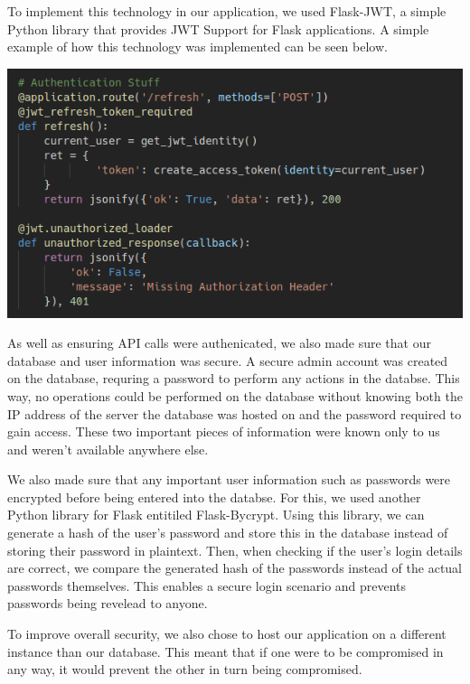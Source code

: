     To implement this technology in our application, we used Flask-JWT, a simple Python library that provides JWT Support for Flask applications.
    A simple example of how this technology was implemented can be seen below.

    \begin{center}    
      \includegraphics{img/JWTExample.png}
    \end{center}

    As well as ensuring API calls were authenicated, we also made sure that our database and user information was secure. A secure admin account was created on the database, requring a password to perform any actions in the databse.
    This way, no operations could be performed on the database without knowing both the IP address of the server the database was hosted on and the password required to gain access. These two important pieces of information were known only to us and 
    weren't available anywhere else. 

    We also made sure that any important user information such as passwords were encrypted before being entered into the databse.
    For this, we used another Python library for Flask entitiled Flask-Bycrypt. Using this library, we can generate a hash of the user's password and store this in the database instead of storing their password in plaintext. Then, when checking if 
    the user's login details are correct, we compare the generated hash of the passwords instead of the actual passwords themselves. This enables a secure login scenario and prevents passwords being revelead to anyone.

    To improve overall security, we also chose to host our application on a different instance than our database. This meant that if one were to be compromised in any way, it would prevent the other in turn being compromised.

